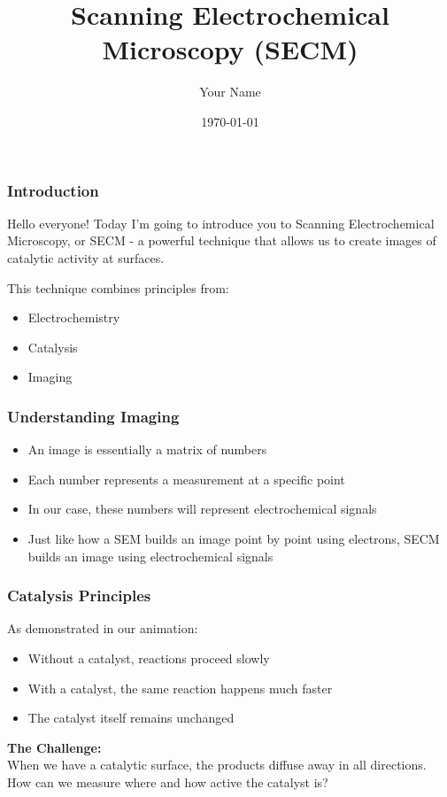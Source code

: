 \documentclass{beamer}
\title{Scanning Electrochemical Microscopy (SECM)}
\author{Your Name}
\institute{Your Institution}
\date{\today}
\begin{document}
\begin{frame}
\titlepage
\end{frame}

\begin{frame}
\frametitle{Introduction}
Hello everyone! Today I'm going to introduce you to Scanning Electrochemical Microscopy, or SECM - a powerful technique that allows us to create images of catalytic activity at surfaces.

\vspace{0.5cm}
This technique combines principles from:
\begin{itemize}
    \item Electrochemistry
    \item Catalysis
    \item Imaging
\end{itemize}
\end{frame}

\begin{frame}
\frametitle{Understanding Imaging}
\begin{itemize}
    \item An image is essentially a matrix of numbers
    \item Each number represents a measurement at a specific point
    \item In our case, these numbers will represent electrochemical signals
    \item Just like how a SEM builds an image point by point using electrons, SECM builds an image using electrochemical signals
\end{itemize}
\end{frame}

\begin{frame}
\frametitle{Catalysis Principles}
As demonstrated in our animation:
\begin{itemize}
    \item Without a catalyst, reactions proceed slowly
    \item With a catalyst, the same reaction happens much faster
    \item The catalyst itself remains unchanged
\end{itemize}

\vspace{0.5cm}
\textbf{The Challenge:}\\
When we have a catalytic surface, the products diffuse away in all directions. How can we measure where and how active the catalyst is?
\end{frame}
\end{document}
